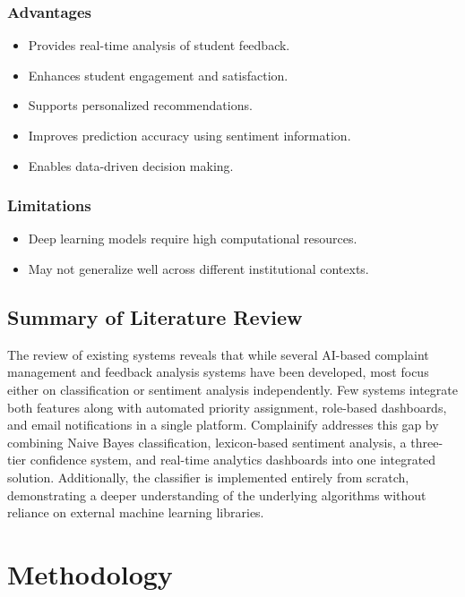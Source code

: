 \documentclass[12pt,a4paper]{report}
\begin{document}
\subsection{Advantages}
\begin{itemize}[nolistsep]
    \item Provides real-time analysis of student feedback.
    \item Enhances student engagement and satisfaction.
    \item Supports personalized recommendations.
    \item Improves prediction accuracy using sentiment information.
    \item Enables data-driven decision making.
\end{itemize}

\subsection{Limitations}
\begin{itemize}[nolistsep]
    \item Deep learning models require high computational resources.
    \item May not generalize well across different institutional contexts.
\end{itemize}

\section{Summary of Literature Review}
The review of existing systems reveals that while several AI-based complaint management and feedback analysis systems have been developed, most focus either on classification or sentiment analysis independently. Few systems integrate both features along with automated priority assignment, role-based dashboards, and email notifications in a single platform. Complainify addresses this gap by combining Naive Bayes classification, lexicon-based sentiment analysis, a three-tier confidence system, and real-time analytics dashboards into one integrated solution. Additionally, the classifier is implemented entirely from scratch, demonstrating a deeper understanding of the underlying algorithms without reliance on external machine learning libraries.

\chapter{Methodology}
\end{document}
